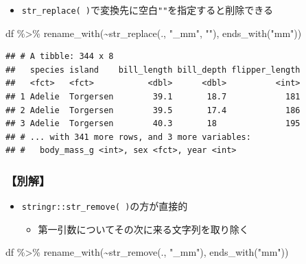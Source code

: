 \documentclass[
  xelatex,ja=standard, b5paper]{bxjsbook}
\newenvironment{Shaded}{\begin{snugshade}}{\end{snugshade}}
\newcommand{\FunctionTok}[1]{\textcolor[rgb]{0.00,0.00,0.00}{#1}}
\newcommand{\NormalTok}[1]{#1}
\newcommand{\SpecialCharTok}[1]{\textcolor[rgb]{0.00,0.00,0.00}{#1}}
\newcommand{\StringTok}[1]{\textcolor[rgb]{0.31,0.60,0.02}{#1}}
\providecommand{\tightlist}{%
  \setlength{\itemsep}{0pt}\setlength{\parskip}{0pt}}
\begin{document}
\begin{itemize}
\tightlist
\item
  \texttt{str\_replace(\ )}で変換先に空白\texttt{""}を指定すると削除できる
\end{itemize}

\begin{Shaded}
\begin{Highlighting}[]
\NormalTok{df }\SpecialCharTok{\%\textgreater{}\%} 
  \FunctionTok{rename\_with}\NormalTok{(}\SpecialCharTok{\textasciitilde{}}\FunctionTok{str\_replace}\NormalTok{(., }\StringTok{"\_mm"}\NormalTok{, }\StringTok{""}\NormalTok{),}
              \FunctionTok{ends\_with}\NormalTok{(}\StringTok{"mm"}\NormalTok{))}
\end{Highlighting}
\end{Shaded}

\begin{verbatim}
## # A tibble: 344 x 8
##   species island    bill_length bill_depth flipper_length
##   <fct>   <fct>           <dbl>      <dbl>          <int>
## 1 Adelie  Torgersen        39.1       18.7            181
## 2 Adelie  Torgersen        39.5       17.4            186
## 3 Adelie  Torgersen        40.3       18              195
## # ... with 341 more rows, and 3 more variables:
## #   body_mass_g <int>, sex <fct>, year <int>
\end{verbatim}

\hypertarget{ux5225ux89e3}{%
\subsubsection{【別解】}\label{ux5225ux89e3}}

\begin{itemize}
\tightlist
\item
  \texttt{stringr::str\_remove(\ )}の方が直接的

  \begin{itemize}
  \tightlist
  \item
    第一引数についてその次に来る文字列を取り除く
  \end{itemize}
\end{itemize}

\begin{Shaded}
\begin{Highlighting}[]
\NormalTok{df }\SpecialCharTok{\%\textgreater{}\%} 
  \FunctionTok{rename\_with}\NormalTok{(}\SpecialCharTok{\textasciitilde{}}\FunctionTok{str\_remove}\NormalTok{(., }\StringTok{"\_mm"}\NormalTok{),}
              \FunctionTok{ends\_with}\NormalTok{(}\StringTok{"mm"}\NormalTok{))}
\end{Highlighting}
\end{Shaded}
\end{document}
